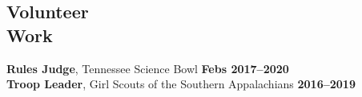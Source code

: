 \documentclass[margin,line]{resume}
\begin{document}
\begin{resume}
    \section{\mysidestyle Volunteer\\Work}
                \textbf{Rules Judge}, Tennessee Science Bowl \hfill \textbf{Febs 2017--2020}\\
                \textbf{Troop Leader}, Girl Scouts of the Southern Appalachians \hfill \textbf{2016--2019}\vspace{.5mm}\\%
                

\end{resume}
\end{document}
